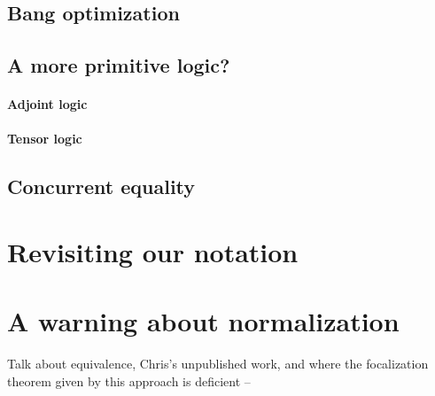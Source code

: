 \subsection{Bang optimization}

\subsection{A more primitive logic?}

\paragraph{Adjoint logic}

\paragraph{Tensor logic}

\subsection{Concurrent equality}

\section{Revisiting our notation}
\label{sec:linnote}

\section{A warning about normalization}
\label{sec:warning}

Talk about equivalence, Chris's unpublished work, and where
the focalization theorem given by this approach is deficient -- 